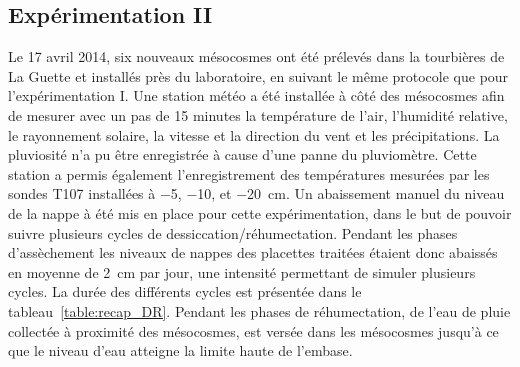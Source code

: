 \subsection{Expérimentation II}
Le 17 avril 2014, six nouveaux mésocosmes ont été prélevés dans la tourbières de La Guette et installés près du laboratoire, en suivant le même protocole que pour l'expérimentation I.
Une station météo a été installée à côté des mésocosmes afin de mesurer avec un pas de 15 minutes la température de l'air, l'humidité relative, le rayonnement solaire, la vitesse et la direction du vent et les précipitations.
La pluviosité n'a pu être enregistrée à cause d'une panne du pluviomètre.
Cette station a permis également l'enregistrement des températures mesurées par les sondes T107 installées à \num{-5}, \num{-10}, et \SI{-20}{\centi\metre}.
Un abaissement manuel du niveau de la nappe à été mis en place pour cette expérimentation, dans le but de pouvoir suivre plusieurs cycles de dessiccation/réhumectation.
Pendant les phases d'assèchement les niveaux de nappes des placettes traitées étaient donc abaissés en moyenne de \SI{2}{\centi\metre} par jour, une intensité permettant de simuler plusieurs cycles.
La durée des différents cycles est présentée dans le tableau~\ref{table:recap_DR}.
Pendant les phases de réhumectation, de l'eau de pluie collectée à proximité des mésocosmes, est versée dans les mésocosmes jusqu'à ce que le niveau d'eau atteigne la limite haute de l'embase. 












